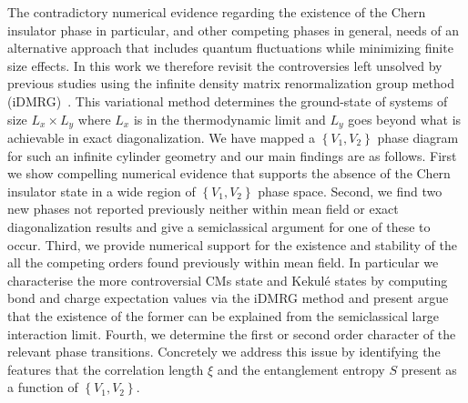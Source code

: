 \documentclass[aps,prx,10pt,twocolumn,floatfix,superscriptaddress,showpacs,numerical,footinbib]{revtex4-1}
\begin{document}
%
The contradictory numerical evidence regarding the existence of the Chern insulator phase in particular, and other competing phases in general, needs of an alternative approach
that includes quantum fluctuations while minimizing finite size effects.
%
In this work we therefore revisit the controversies left unsolved by previous studies using the infinite density matrix renormalization group method (iDMRG)~\cite{M08,W92,KZM13}. 
%
This variational method determines the ground-state of systems of size $L_{x} \times L_{y}$ where $L_{x}$ is in the thermodynamic limit and $L_{y}$ goes beyond
what is achievable in exact diagonalization.
%
We have mapped a $\left\lbrace V_{1},V_{2}\right\rbrace$ phase diagram for such an infinite cylinder geometry and our main findings are as follows.
%
First we show compelling numerical evidence that supports the absence of the Chern insulator state in a wide region of $\left\lbrace V_{1},V_{2}\right\rbrace$ phase space.
%
Second, we find two new phases not reported previously neither within mean field or exact diagonalization results and give a semiclassical argument for one 
of these to occur.
%
Third, we provide numerical support for the existence and stability of the all the competing orders found previously within mean field.
%
In particular we characterise the more controversial CMs state and Kekul\'{e} states by computing bond and charge expectation values via the iDMRG method 
and present argue that the existence of the former can be explained from the semiclassical large interaction limit.
%
Fourth, we determine the first or second order character of the relevant phase transitions.
%
Concretely we address this issue by identifying the features that the correlation length $\xi$ and the entanglement entropy $S$ present as a function of $\left\lbrace V_{1},V_{2}\right\rbrace$.\\
\end{document}
